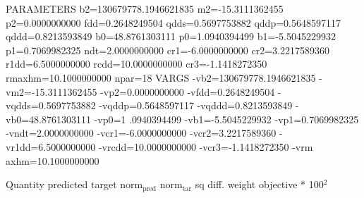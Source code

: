 \documentclass[11pt]{article}
\begin{document}
PARAMETERS
  b2=130679778.1946621835 m2=-15.3111362455 p2=0.0000000000 fdd=0.2648249504 qdds=0.5697753882 qddp=0.5648597117 qddd=0.8213593849 b0=48.8761303111 p0=1.0940394499 b1=-5.5045229932 p1=0.7069982325 ndt=2.0000000000 cr1=-6.0000000000 cr2=3.2217589360 r1dd=6.5000000000 rcdd=10.0000000000 cr3=-1.1418272350 rmaxhm=10.1000000000 npar=18 
VARGS
    -vb2=130679778.1946621835 -vm2=-15.3111362455 -vp2=0.0000000000 -vfdd=0.2648249504 -vqdds=0.5697753882 -vqddp=0.5648597117 -vqddd=0.8213593849 -vb0=48.8761303111 -vp0=1
.0940394499 -vb1=-5.5045229932 -vp1=0.7069982325 -vndt=2.0000000000 -vcr1=-6.0000000000 -vcr2=3.2217589360 -vr1dd=6.5000000000 -vrcdd=10.0000000000 -vcr3=-1.1418272350 -vrm
axhm=10.1000000000 


Quantity      predicted    target     norm\(_{\text{pred}}\)   norm\(_{\text{tar}}\)    sq diff.      weight    objective * 100\(^{\text{2}}\) 
\end{document}
